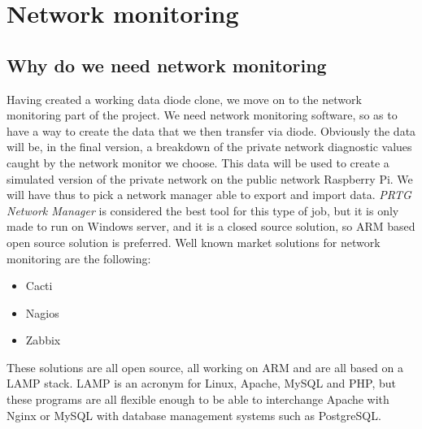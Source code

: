 \documentclass[a4paper,11pt]{scrartcl}
\begin{document}
\section{Network monitoring}
\subsection{Why do we need network monitoring}
Having created a working data diode clone, we move on to the network monitoring part of the project. We need network monitoring software, so as to have a way to create the data that we then transfer via diode. Obviously the data will be, in the final version, a breakdown of the private network diagnostic values caught by the network monitor we choose. This data will be used to create a simulated version of the private network on the public network Raspberry Pi. 
We will have thus to pick a network manager able to export and import data. \textit{PRTG Network Manager} is considered the best tool for this type of job, but it is only made to run on Windows server, and it is a closed source solution, so ARM based open source solution is preferred.
Well known market solutions for network monitoring are the following:
\begin{itemize}
    \item Cacti
    \item Nagios
    \item Zabbix
\end{itemize}
These solutions are all open source, all working on ARM and are all based on a LAMP stack. LAMP is an acronym for Linux, Apache, MySQL and PHP, but these programs are all flexible enough to be able to interchange Apache with Nginx or MySQL with database management systems such as PostgreSQL. 
\end{document}
